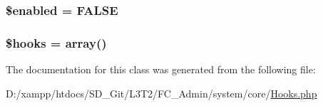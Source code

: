 \subsubsection[{\$enabled}]{\setlength{\rightskip}{0pt plus 5cm}\$enabled = F\+A\+L\+S\+E}\label{class_c_i___hooks_a8d376199cc641e3e7af6e1a0d5c736d9}
\hypertarget{class_c_i___hooks_a05aec88c3516c6db5da524fbcc673aff}{}
\subsubsection[{\$hooks}]{\setlength{\rightskip}{0pt plus 5cm}\$hooks = array()}\label{class_c_i___hooks_a05aec88c3516c6db5da524fbcc673aff}


The documentation for this class was generated from the following file\+:\begin{DoxyCompactItemize}
\item 
D\+:/xampp/htdocs/\+S\+D\+\_\+\+Git/\+L3\+T2/\+F\+C\+\_\+\+Admin/system/core/\hyperlink{system_2core_2hooks_8php}{Hooks.\+php}\end{DoxyCompactItemize}
